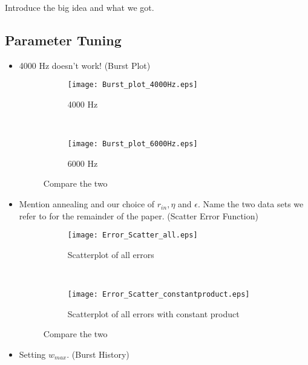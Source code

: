 Introduce the big idea and what we got.

\subsection{Parameter Tuning}

\begin{itemize}
\item 4000 Hz doesn't work! (Burst Plot)

\begin{figure}[H]
\centering
\begin{subfigure}[b]{0.49\textwidth}
\texttt{[image: Burst\_plot\_4000Hz.eps]}
\caption{4000 Hz}
\label{burstSTDP:4000}
\end{subfigure}
\,
\begin{subfigure}[b]{0.49\textwidth}
\texttt{[image: Burst\_plot\_6000Hz.eps]}
\caption{6000 Hz}
\label{burstSTDP:6000}
\end{subfigure}
\caption{Compare the two}
\label{burstSTDP}
\end{figure}

\item Mention annealing and our choice of \(r_{in}, \eta\) and \(\epsilon\). Name the two data sets we refer to for the remainder of the paper. (Scatter Error Function)

\begin{figure}[H]
\centering
\begin{subfigure}[b]{0.49\textwidth}
\texttt{[image: Error\_Scatter\_all.eps]}
\label{Error_scatter: all}
\caption{Scatterplot of all errors}
\end{subfigure}
\,
\begin{subfigure}[b]{0.49\textwidth}
\texttt{[image: Error\_Scatter\_constantproduct.eps]}
\label{Error_scatter: constant product}
\caption{Scatterplot of all errors with constant product}
\end{subfigure}
\label{Error_scatter}
\caption{Compare the two}
\end{figure}

\item Setting \(w_{max}\). (Burst History)


\end{itemize}
